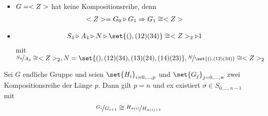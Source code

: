 \begin{*example}
	\begin{itemize}
		\item $G = <Z>$ hat keine Kompositionsreihe, denn
		\begin{align*}
		<Z> = G_0 \triangleright G_1 \Rightarrow G_1 \cong <Z>	
		\end{align*}
		\item 
		\begin{align*}
			S_4 \rhd A_4 \rhd N \rhd \set{(),(12)(34)} \cong \Z_2 \rhd 1\\
		\end{align*}
		mit $\lnkset{S_4}{A_4} \cong \Z_2, N = \set{(),(12)(34),(13)(24),(14)(23)}, \lnkset{N}{\set{(),(12)(34)}} \cong \Z_2$
	\end{itemize}
\end{*example}
\begin{proposition}
	Sei $G$ endliche Gruppe und seien $\set{H_i}_{i=0,\dots,p}$ und $\set{G_j}_{j=0,\dots,n}$ zwei Kompositionsreihe der Länge $p$. Dann gilt $p = n$ und ex existiert $\sigma \in S_{0,\dots, n-1}$ mit
	\begin{align*}
		\lnkset{G_i}{G_{i+1}} \cong \lnkset{H_{\sigma(i)}}{H_{\sigma(i)+1}}
	\end{align*}
\end{proposition}
